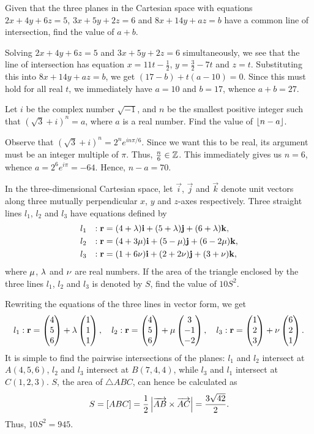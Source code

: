 \clearpage
\begin{question}[27]\label{Q::2020-O-1-4}
    Given that the three planes in the Cartesian space with equations $2x + 4y + 6z = 5$, $3x + 5y + 2z = 6$ and $8x + 14y + az = b$ have a common line of intersection, find the value of $a + b$.
\end{question}
\begin{solution*}
    Solving $2x + 4y + 6z = 5$ and $3x + 5y + 2z = 6$ simultaneously, we see that the line of intersection has equation $x = 11t - \frac12$, $y = \frac32 - 7t$ and $z = t$. Substituting this into $8x + 14y + az = b$, we get $(17-b) + t(a-10) = 0$. Since this must hold for all real $t$, we immediately have $a = 10$ and $b = 17$, whence $a + b = 27$.
\end{solution*}

\begin{question}[70]\label{Q::2020-O-1-5}
    Let $i$ be the complex number $\sqrt{-1}$, and $n$ be the smallest positive integer such that $(\sqrt3 + i)^n = a$, where $a$ is a real number. Find the value of $\left\lfloor n-a \right\rfloor$.
\end{question}
\begin{solution*}
    Observe that $(\sqrt3 + i)^n = 2^n e^{in\pi/6}$. Since we want this to be real, its argument must be an integer multiple of $\pi$. Thus, $\frac{n}{6} \in \mathbb{Z}$. This immediately gives us $n = 6$, whence $a = 2^6 e^{i\pi} = -64$. Hence, $n - a = 70$.
\end{solution*}

\begin{question}[945]\label{Q::2020-O-1-6}
    In the three-dimensional Cartesian space, let $\vec i$, $\vec j$ and $\vec k$ denote unit vectors along three mutually perpendicular $x$, $y$ and $z$-axes respectively. Three straight lines $l_1$, $l_2$ and $l_3$ have equations defined by
    \begin{alignat*}{2}
    l_1 && : \mathbf{r} &= (4 + \lambda)\mathbf{i} + (5 + \lambda)\mathbf{j} + (6 + \lambda)\mathbf{k},\\
    l_2 && : \mathbf{r} &= (4 + 3\mu)\mathbf{i} + (5 - \mu)\mathbf{j} + (6 - 2\mu) \mathbf{k},\\
    l_3 && : \mathbf{r} &= (1 + 6\nu)\mathbf{i} + (2 + 2\nu) \mathbf{j} + (3 + \nu) \mathbf{k},
    \end{alignat*}
    where $\mu$, $\lambda$ and $\nu$ are real numbers. If the area of the triangle enclosed by the three lines $l_1$, $l_2$ and $l_3$ is denoted by $S$, find the value of $10S^2$.
\end{question}
\begin{solution*}
    Rewriting the equations of the three lines in vector form, we get \[l_1 : \mathbf{r} = \begin{pmatrix} 4 \\ 5 \\ 6 \end{pmatrix} + \lambda \begin{pmatrix} 1 \\ 1 \\ 1 \end{pmatrix}, \quad l_2 : \mathbf{r} = \begin{pmatrix} 4 \\ 5 \\ 6 \end{pmatrix} + \mu \begin{pmatrix} 3 \\ -1 \\ -2 \end{pmatrix}, \quad l_3 : \mathbf{r} = \begin{pmatrix} 1 \\ 2 \\ 3 \end{pmatrix} + \nu \begin{pmatrix} 6 \\ 2 \\ 1 \end{pmatrix}.\] It is simple to find the pairwise intersections of the planes: $l_1$ and $l_2$ intersect at $A(4, 5, 6)$, $l_2$ and $l_3$ intersect at $B(7, 4, 4)$, while $l_3$ and $l_1$ intersect at $C(1, 2, 3)$. $S$, the area of $\triangle ABC$, can hence be calculated as \[S = [ABC] = \frac12 \left\lvert \overrightarrow{AB} \times \overrightarrow{AC} \right\rvert = \frac{3\sqrt{42}}{2}.\] Thus, $10S^2 = 945$.
\end{solution*}

